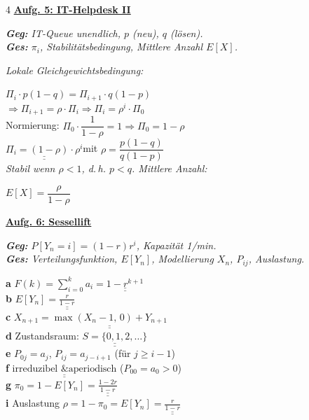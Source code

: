 \documentclass[landscape,a4paper,8pt]{article}
\newcommand{\aufgabe}[1]{\vspace{1pt}\textbf{\underline{#1}}\par}
\newcommand{\teil}[1]{\textbf{#1}\;}
\newcommand{\erkl}[1]{{\small\textit{#1}}\par}
\newcommand{\erg}[1]{\underline{\underline{#1}}}
\begin{document}
\begin{multicols*}{4}
\aufgabe{Aufg. 5: IT-Helpdesk II}
\erkl{\textbf{Geg:} IT-Queue unendlich, $p$ (neu), $q$ (lösen).\\\textbf{Ges:} $\pi_i$, Stabilitätsbedingung, Mittlere Anzahl $E[X]$.}
\erkl{Lokale Gleichgewichtsbedingung:}
$\Pi_i\cdot p(1-q)=\Pi_{i+1}\cdot q(1-p)$\\
$\Rightarrow\Pi_{i+1}=\rho\cdot\Pi_i\Rightarrow\Pi_i=\rho^i\cdot\Pi_0$\\
Normierung: $\Pi_0\cdot\dfrac{1}{1-\rho}=1\Rightarrow\Pi_0=1-\rho$\\[2pt]
$\erg{\Pi_i=(1-\rho)\cdot\rho^i}$\quad mit $\rho=\dfrac{p(1-q)}{q(1-p)}$\\[2pt]
\erkl{Stabil wenn $\rho<1$, d.\,h. $p<q$. Mittlere Anzahl:}
$E[X]=\dfrac{\rho}{1-\rho}$

\aufgabe{Aufg. 6: Sessellift}
\erkl{\textbf{Geg:} $P[Y_n{=}i]=(1-r)r^i$, Kapazität 1/min.\\\textbf{Ges:} Verteilungsfunktion, $E[Y_n]$, Modellierung $X_n$, $P_{ij}$, Auslastung.}
\teil{a} $F(k) = \sum_{i=0}^k a_i = \erg{1 - r^{k+1}}$\\
\teil{b} $E[Y_n] = \erg{\frac{r}{1-r}}$\\
\teil{c} $X_{n+1} = \erg{\max(X_n - 1,\, 0) + Y_{n+1}}$\\
\teil{d} Zustandsraum: $\erg{S = \{0, 1, 2, \ldots\}}$\\
\teil{e} $P_{0j} = a_j$, \quad $P_{ij} = a_{j-i+1}$ (für $j \ge i-1$)\\
\teil{f} $\erg{\text{irreduzibel \& aperiodisch}}$ ($P_{00}=a_0>0$)\\
\teil{g} $\pi_0 = 1 - E[Y_n] = \erg{\frac{1-2r}{1-r}}$\\
\teil{i} Auslastung $\rho = 1-\pi_0 = E[Y_n] = \erg{\frac{r}{1-r}}$

\end{multicols*}
\end{document}
